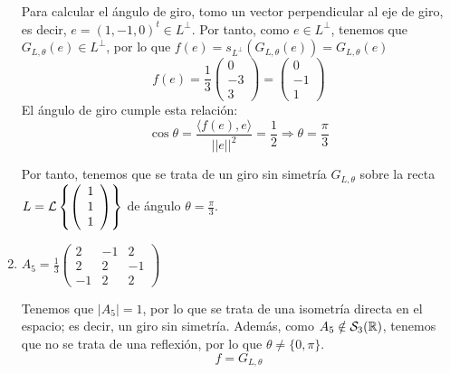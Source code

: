 \begin{ejercicio}
\begin{enumerate}
        Para calcular el ángulo de giro, tomo un vector perpendicular al eje de giro, es decir, $e=(1, -1, 0)^t\in L^\perp$. Por tanto, como $e\in L^\perp$, tenemos que $G_{L,\theta}(e)\in L^\perp$, por lo que $f(e)=s_{L^\perp}(G_{L,\theta}(e))=G_{L,\theta}(e)$
        \begin{equation*}
            f(e)=\frac{1}{3}\left(\begin{array}{c}
                     0 \\ -3 \\ 3
                \end{array}\right) = \left(\begin{array}{c}
                     0 \\ -1 \\ 1
                \end{array}\right)
        \end{equation*}
        El ángulo de giro cumple esta relación:
        \begin{equation*}
            \cos \theta = \frac{\langle f(e),e\rangle}{||e||^2} = \frac{1}{2} \Longrightarrow \theta = \frac{\pi}{3}
        \end{equation*}

        Por tanto, tenemos que se trata de un giro sin simetría $G_{L,\theta}$ sobre la recta $L=\mathcal{L}\left\{\left(\begin{array}{c}
                     1\\ 1 \\ 1
                \end{array}\right)\right\}$ de ángulo $\theta=\frac{\pi}{3}$.




        \item $A_5=\frac{1}{3}\left(\begin{array}{ccc}
            2 & -1 & 2 \\
            2 & 2 & -1 \\
            -1 & 2 & 2
        \end{array}\right)$

        Tenemos que $|A_5|=1$, por lo que se trata de una isometría directa en el espacio; es decir, un giro sin simetría. Además, como $A_5\notin \mathcal{S}_3(\mathbb{R})$, tenemos que no se trata de una reflexión, por lo que $\theta\neq \{0,\pi\}$.
        \begin{equation*}
            f=G_{L,\theta}
        \end{equation*}


\end{enumerate}
\end{ejercicio}
